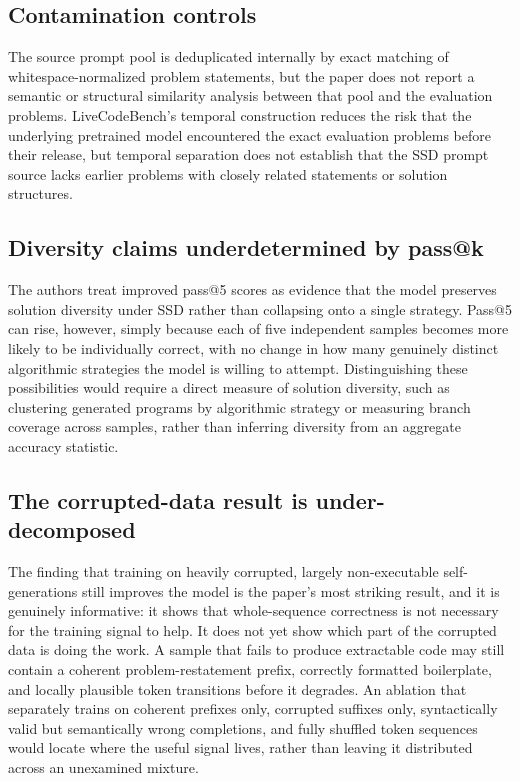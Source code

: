 \documentclass[11pt]{article}
\begin{document}
\subsection{Contamination controls}

The source prompt pool is deduplicated internally by exact matching of whitespace-normalized problem statements, but the paper does not report a semantic or structural similarity analysis between that pool and the evaluation problems. LiveCodeBench's temporal construction reduces the risk that the underlying pretrained model encountered the exact evaluation problems before their release, but temporal separation does not establish that the SSD prompt source lacks earlier problems with closely related statements or solution structures.

\subsection{Diversity claims underdetermined by pass@k}

The authors treat improved pass@5 scores as evidence that the model preserves solution diversity under SSD rather than collapsing onto a single strategy. Pass@5 can rise, however, simply because each of five independent samples becomes more likely to be individually correct, with no change in how many genuinely distinct algorithmic strategies the model is willing to attempt. Distinguishing these possibilities would require a direct measure of solution diversity, such as clustering generated programs by algorithmic strategy or measuring branch coverage across samples, rather than inferring diversity from an aggregate accuracy statistic.

\subsection{The corrupted-data result is under-decomposed}

The finding that training on heavily corrupted, largely non-executable self-generations still improves the model is the paper's most striking result, and it is genuinely informative: it shows that whole-sequence correctness is not necessary for the training signal to help. It does not yet show which part of the corrupted data is doing the work. A sample that fails to produce extractable code may still contain a coherent problem-restatement prefix, correctly formatted boilerplate, and locally plausible token transitions before it degrades. An ablation that separately trains on coherent prefixes only, corrupted suffixes only, syntactically valid but semantically wrong completions, and fully shuffled token sequences would locate where the useful signal lives, rather than leaving it distributed across an unexamined mixture.
\end{document}
